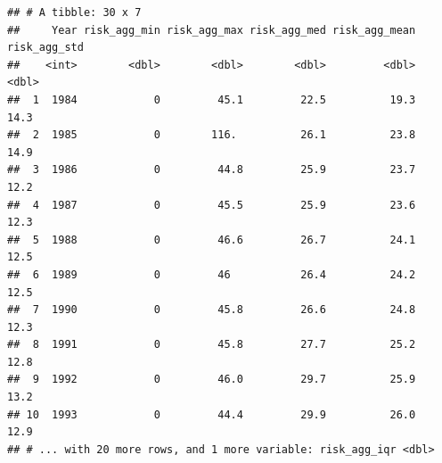 \documentclass[11pt,]{article}
\newenvironment{Shaded}{\begin{snugshade}}{\end{snugshade}}
\newcommand{\KeywordTok}[1]{\textcolor[rgb]{0.13,0.29,0.53}{\textbf{#1}}}
\newcommand{\DataTypeTok}[1]{\textcolor[rgb]{0.13,0.29,0.53}{#1}}
\newcommand{\StringTok}[1]{\textcolor[rgb]{0.31,0.60,0.02}{#1}}
\newcommand{\OperatorTok}[1]{\textcolor[rgb]{0.81,0.36,0.00}{\textbf{#1}}}
\newcommand{\NormalTok}[1]{#1}
\begin{document}
\begin{Shaded}
\end{Shaded}

\begin{verbatim}
## # A tibble: 30 x 7
##     Year risk_agg_min risk_agg_max risk_agg_med risk_agg_mean risk_agg_std
##    <int>        <dbl>        <dbl>        <dbl>         <dbl>        <dbl>
##  1  1984            0         45.1         22.5          19.3         14.3
##  2  1985            0        116.          26.1          23.8         14.9
##  3  1986            0         44.8         25.9          23.7         12.2
##  4  1987            0         45.5         25.9          23.6         12.3
##  5  1988            0         46.6         26.7          24.1         12.5
##  6  1989            0         46           26.4          24.2         12.5
##  7  1990            0         45.8         26.6          24.8         12.3
##  8  1991            0         45.8         27.7          25.2         12.8
##  9  1992            0         46.0         29.7          25.9         13.2
## 10  1993            0         44.4         29.9          26.0         12.9
## # ... with 20 more rows, and 1 more variable: risk_agg_iqr <dbl>
\end{verbatim}
\end{document}
